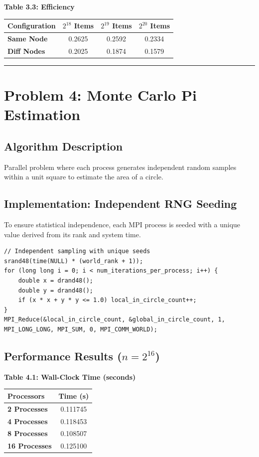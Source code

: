 \documentclass[11pt]{article}
\begin{document}
\begin{center}
\textbf{Table 3.3: Efficiency} \\
\begin{tabular}{@{}lccc@{}}
\toprule
Configuration & $2^{18}$ Items & $2^{19}$ Items & $2^{20}$ Items \\
\midrule
\textbf{Same Node} & 0.2625 & 0.2592 & 0.2334 \\
\textbf{Diff Nodes} & 0.2025 & 0.1874 & 0.1579 \\
\bottomrule
\end{tabular}
\end{center}

\noindent\rule{\textwidth}{0.4pt}

\section*{\color{white}Problem 4: Monte Carlo Pi Estimation}

\subsection*{Algorithm Description}
Parallel problem where each process generates independent random samples within a unit square to estimate the area of a circle. 

\subsection*{Implementation: Independent RNG Seeding}
To ensure statistical independence, each MPI process is seeded with a unique value derived from its rank and system time.

\begin{lstlisting}
// Independent sampling with unique seeds
srand48(time(NULL) * (world_rank + 1));
for (long long i = 0; i < num_iterations_per_process; i++) {
    double x = drand48();
    double y = drand48();
    if (x * x + y * y <= 1.0) local_in_circle_count++;
}
MPI_Reduce(&local_in_circle_count, &global_in_circle_count, 1, MPI_LONG_LONG, MPI_SUM, 0, MPI_COMM_WORLD);
\end{lstlisting}

\subsection*{Performance Results ($n = 2^{16}$)}

\begin{center}
\textbf{Table 4.1: Wall-Clock Time (seconds)} \\
\begin{tabular}{@{}lc@{}}
\toprule
Processors & Time (s) \\
\midrule
\textbf{2 Processes} & 0.111745 \\
\textbf{4 Processes} & 0.118453 \\
\textbf{8 Processes} & 0.108507 \\
\textbf{16 Processes} & 0.125100 \\
\bottomrule
\end{tabular}
\end{center}
\end{document}
